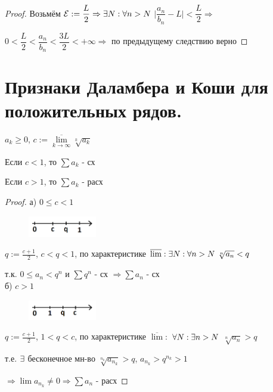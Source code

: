 \documentclass[matan]{subfiles}
\begin{document}
  \begin{proof}
      Возьмём $\mathcal{E}:=\dfrac{L}{2} \Rightarrow \exists N: \forall n > N$ $\big|\dfrac{a_n}{b_n} - L\big| < \dfrac{L}{2} \Rightarrow$

      $0 < \dfrac{L}{2} < \dfrac{a_n}{b_n} < \dfrac{3L}{2} < +\infty \Rightarrow$ по предыдущему следствию верно
  \end{proof}

  \newpage
  \section{Признаки Даламбера и Коши для положительных рядов.}

  \begin{theorem} 
      $a_k \geqslant 0$, $c:=\overline{\lim\limits_{k \rightarrow \infty}} \sqrt[k]{a_k}$

      Если $c < 1$, то $\sum a_k$ - сх

      Если $c > 1$, то $\sum a_k$ - расх
  \end{theorem}

  \begin{proof}

      а) $0 \leqslant c < 1$
      \begin{figure}[H]
          \centering
          \includegraphics[width=3cm]{pics/17_1}
      \end{figure}
      $q := \frac{c+1}{2}$, $c<q<1$, по характеристике $\overline{\lim}: \exists N: \forall n > N\ \sqrt[n]{a_n} < q$

      т.к. $0 \leqslant a_n < q^n$ и $\sum q^n$ - сх $\Rightarrow \sum a_n$ - сх
      \\
      б) $c > 1$
      \begin{figure}[H]
          \centering
          \includegraphics[width=3cm]{pics/17_2}
      \end{figure}
      $q := \frac{c+1}{2}$, $1<q<c$, по характеристике $\overline{\lim}:$ $\forall N: \exists n > N$ $\sqrt[n]{a_n} > q$

      т.е. $\exists$ бесконечное мн-во $\sqrt[n_k]{a_{n_k}} > q$, $a_{n_k} > q^{n_k} > 1$

      $\Rightarrow \lim a_{n_k} \neq 0 \Rightarrow \sum a_n$ - расх
  \end{proof}
\end{document}
